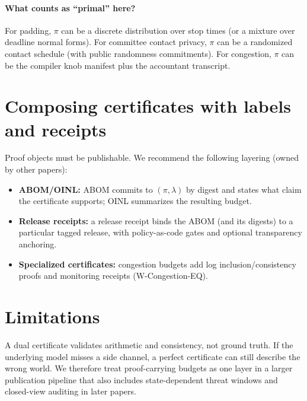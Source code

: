 \documentclass[11pt]{article}
\begin{document}
\paragraph{What counts as ``primal'' here?}
For padding, $\pi$ can be a discrete distribution over stop times (or a mixture over deadline normal forms).
For committee contact privacy, $\pi$ can be a randomized contact schedule (with public randomness commitments).
For congestion, $\pi$ can be the compiler knob manifest plus the accountant transcript.

\section{Composing certificates with labels and receipts}
Proof objects must be publishable.
We recommend the following layering (owned by other papers):
\begin{itemize}[leftmargin=*]
\item \textbf{ABOM/OINL:} ABOM commits to $(\pi,\lambda)$ by digest and states what claim the certificate supports; OINL summarizes the resulting budget.\cite{series:abomoinl}
\item \textbf{Release receipts:} a release receipt binds the ABOM (and its digests) to a particular tagged release, with policy-as-code gates and optional transparency anchoring.\cite{series:releaseproperty}
\item \textbf{Specialized certificates:} congestion budgets add log inclusion/consistency proofs and monitoring receipts (W-Congestion-EQ).\cite{series:wcongeq}
\end{itemize}

\section{Limitations}
A dual certificate validates arithmetic and consistency, not ground truth.
If the underlying model misses a side channel, a perfect certificate can still describe the wrong world.
We therefore treat proof-carrying budgets as one layer in a larger publication pipeline that also includes state-dependent threat windows and closed-view auditing in later papers.
\end{document}
